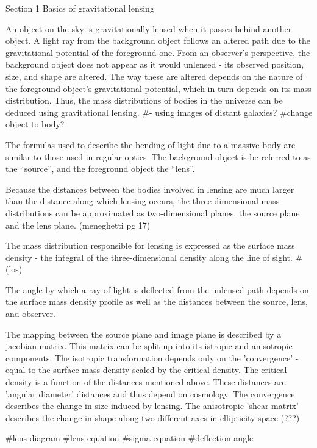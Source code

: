 



Section 1
Basics of gravitational lensing

An object on the sky is gravitationally lensed when it passes behind another object.
A light ray from the background object follows an altered path due to the gravitational potential of the foreground one.
From an observer's perspective, the background object does not appear as it would unlensed - its observed position, size, and shape are altered.
The way these are altered depends on the nature of the foreground object's gravitational potential, which in turn depends on its mass distribution.
Thus, the mass distributions of bodies in the universe can be deduced using gravitational lensing. #- using images of distant galaxies?
#change object to body?

The formulas used to describe the bending of light due to a massive body are similar to those used in regular optics.
The background object is be referred to as the ``source'', and the foreground object the ``lens''.

Because the distances between the bodies involved in lensing are much larger than the distance along which lensing occurs, the three-dimensional mass distributions can be approximated as two-dimensional planes, the source plane and the lens plane. (meneghetti pg 17)

The mass distribution responsible for lensing is expressed as the surface mass density - the integral of the three-dimensional density along the line of sight. #(los)

The angle by which a ray of light is deflected from the unlensed path
depends on the surface mass density profile as well as the distances
between the source, lens, and observer. 

The mapping between the source plane and image plane is described by a
jacobian matrix. This matrix can be split up into its istropic and
anisotropic components. The isotropic transformation depends only on
the 'convergence' - equal to the surface mass density scaled by the
critical density. The critical density is a function of the distances
mentioned above. These distances are 'angular diameter' distances and
thus depend on cosmology. The convergence describes the change in size
induced by lensing. The anisotropic 'shear matrix' describes the
change in shape along two different axes in ellipticity space (???)

#lens diagram
#lens equation
#sigma equation
#deflection angle



